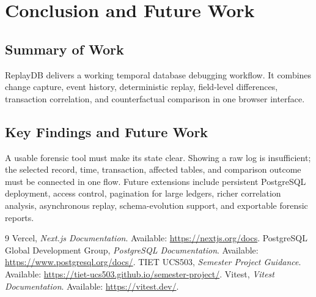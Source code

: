 \documentclass{tietreport}
\begin{document}
\chapter{Conclusion and Future Work}
\section{Summary of Work}
ReplayDB delivers a working temporal database debugging workflow. It combines change capture, event history, deterministic replay, field-level differences, transaction correlation, and counterfactual comparison in one browser interface.

\section{Key Findings and Future Work}
A usable forensic tool must make its state clear. Showing a raw log is insufficient; the selected record, time, transaction, affected tables, and comparison outcome must be connected in one flow. Future extensions include persistent PostgreSQL deployment, access control, pagination for large ledgers, richer correlation analysis, asynchronous replay, schema-evolution support, and exportable forensic reports.

\begin{thebibliography}{9}
 Vercel, \emph{Next.js Documentation}. Available: \url{https://nextjs.org/docs}.
 PostgreSQL Global Development Group, \emph{PostgreSQL Documentation}. Available: \url{https://www.postgresql.org/docs/}.
 TIET UCS503, \emph{Semester Project Guidance}. Available: \url{https://tiet-ucs503.github.io/semester-project/}.
 Vitest, \emph{Vitest Documentation}. Available: \url{https://vitest.dev/}.
\end{thebibliography}
\end{document}
